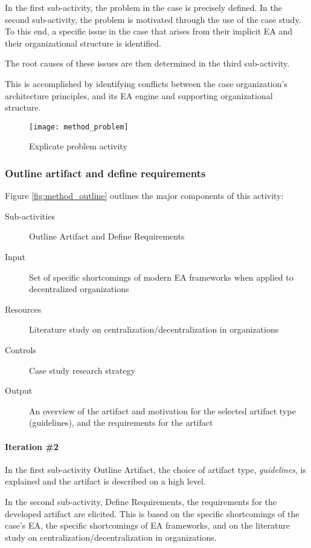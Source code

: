 In the first sub-activity, the problem in the case is precisely defined. In the second sub-activity, the problem is motivated through the use of the case study. To this end, a specific issue in the case that arises from their implicit EA and their organizational structure is identified.

The root causes of these issues are then determined in the third sub-activity. 

This is accomplished by identifying conflicts between the case organization's architecture principles, and its EA engine and supporting organizational structure.

\begin{figure}
\texttt{[image: method\_problem]}
\caption{Explicate problem activity}
\label{fig:method_problem}
\end{figure}

\subsubsection*{Outline artifact and define requirements}

Figure \ref{fig:method_outline} outlines the major components of this activity:
\begin{description}
  \item[Sub-activities] Outline Artifact and Define Requirements~\cite[Ch. 6]{johannessonPerjons2012}
  \item[Input] Set of specific shortcomings of modern EA frameworks when applied to decentralized organizations
  \item[Resources] Literature study on centralization/decentralization in  organizations
  \item[Controls] Case study research strategy
  \item[Output] An overview of the artifact and motivation for the selected artifact type (guidelines), and the requirements for the artifact
\end{description}

\paragraph{Iteration \#2}

In the first sub-activity Outline Artifact, the choice of artifact type, \textit{guidelines}, is explained and the artifact is described on a high level.

In the second sub-activity, Define Requirements, the requirements for the developed artifact are elicited. This is based on the specific shortcomings of the case's EA, the specific shortcomings of EA frameworks, and on the literature study on centralization/decentralization in organizations.



